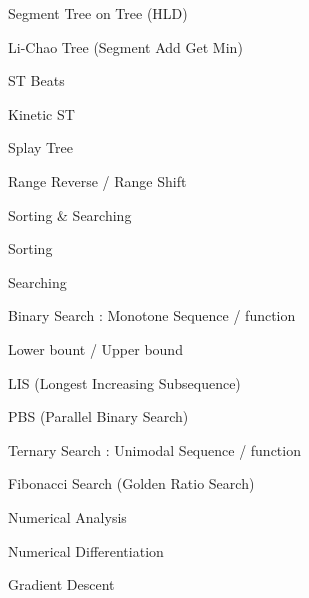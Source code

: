 \documentclass[landscape, 8pt, a4paper, oneside]{extarticle}
\begin{document}
\begin{multicols}{3}
\begin{tcolorbox}[breakable, enhanced, sharp corners, colback=white, colframe=black, boxrule=1pt, left=0pt]
\begin{IdeaNote}
\begin{IdeaNote}
\begin{IdeaNote}
\begin{IdeaNote}
            \item Segment Tree on Tree (HLD)
            \item Li-Chao Tree (Segment Add Get Min)
            \item ST Beats
            \item Kinetic ST
            \end{IdeaNote}
        \item Splay Tree
            \begin{IdeaNote}
            \item Range Reverse / Range Shift
            \end{IdeaNote}
        \end{IdeaNote}
    \end{IdeaNote}

\item Sorting \& Searching
    \begin{IdeaNote}
    \item Sorting
    \item Searching
        \begin{IdeaNote}
        \item Binary Search : Monotone Sequence / function
            \begin{IdeaNote}
            \item Lower bount / Upper bound
            \item LIS (Longest Increasing Subsequence)
            \item PBS (Parallel Binary Search)
            \end{IdeaNote}
        \item Ternary Search : Unimodal Sequence / function
            \begin{IdeaNote}
            \item Fibonacci Search (Golden Ratio Search)
            \end{IdeaNote}
        \end{IdeaNote}
    \end{IdeaNote}

\item Numerical Analysis
    \begin{IdeaNote}
    \item Numerical Differentiation
    \item Gradient Descent
    \end{IdeaNote}


\end{IdeaNote}
\end{tcolorbox}
\end{multicols}
\end{document}
